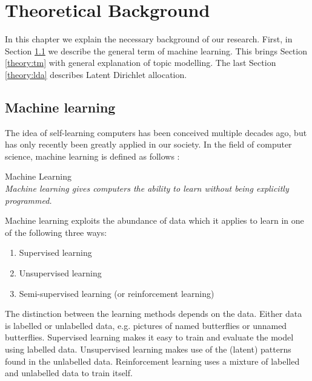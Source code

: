 \chapter{Theoretical Background}  \label{ch:theory}

In this chapter we explain the necessary background of our research. First, in Section \ref{theory:machinelearning} we describe the general term of machine learning. This brings Section \ref{theory:tm} with general explanation of topic modelling. The last Section \ref{theory:lda} describes Latent Dirichlet allocation.

\section{Machine learning} \label{theory:machinelearning}
The idea of self-learning computers has been conceived multiple decades ago, but has only recently been greatly applied in our society.
In the field of computer science, machine learning is defined as follows \cite{Samuel1959SomeCheckers}:\\

\theoremstyle{definition} 
\begin{definition}{Machine Learning} 
\\\textit{Machine learning gives computers the ability to learn without being explicitly programmed.}
\end{definition}

\noindent Machine learning exploits the abundance of data which it applies to learn in one of the following three ways:

\begin{enumerate}
    \item Supervised learning
    \item Unsupervised learning
    \item Semi-supervised learning (or reinforcement learning)
\end{enumerate}

The distinction between the learning methods depends on the data. Either data is labelled or unlabelled data, e.g. pictures of named butterflies or unnamed butterflies. Supervised learning makes it easy to train and evaluate the model using labelled data. Unsupervised learning makes use of the (latent) patterns found in the unlabelled data. Reinforcement learning uses a mixture of labelled and unlabelled data to train itself. 

